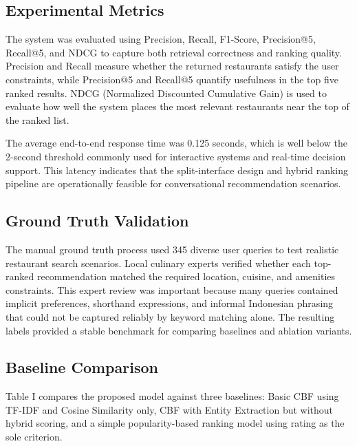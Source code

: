 \documentclass[conference]{IEEEtran}
\begin{document}
\subsection{Experimental Metrics}
The system was evaluated using Precision, Recall, F1-Score, Precision@5, Recall@5, and NDCG to capture both retrieval correctness and ranking quality\cite{b6,b10,b11}. Precision and Recall measure whether the returned restaurants satisfy the user constraints, while Precision@5 and Recall@5 quantify usefulness in the top five ranked results. NDCG (Normalized Discounted Cumulative Gain) is used to evaluate how well the system places the most relevant restaurants near the top of the ranked list\cite{b6,b10,b11}.

The average end-to-end response time was 0.125 seconds, which is well below the 2-second threshold commonly used for interactive systems and real-time decision support\cite{b13}. This latency indicates that the split-interface design and hybrid ranking pipeline are operationally feasible for conversational recommendation scenarios\cite{b12,b13,b14}.

\subsection{Ground Truth Validation}
The manual ground truth process used 345 diverse user queries to test realistic restaurant search scenarios. Local culinary experts verified whether each top-ranked recommendation matched the required location, cuisine, and amenities constraints. This expert review was important because many queries contained implicit preferences, shorthand expressions, and informal Indonesian phrasing that could not be captured reliably by keyword matching alone\cite{b7,b16,b14}. The resulting labels provided a stable benchmark for comparing baselines and ablation variants.

\subsection{Baseline Comparison}
Table I compares the proposed model against three baselines: Basic CBF using TF-IDF and Cosine Similarity only, CBF with Entity Extraction but without hybrid scoring, and a simple popularity-based ranking model using rating as the sole criterion.
\end{document}
